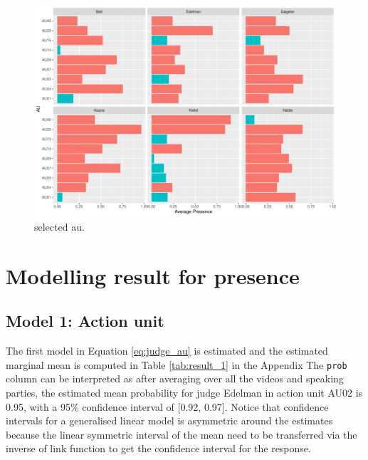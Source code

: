\documentclass{monashthesis}
\begin{document}
\begin{figure}

{\centering \includegraphics[width=1\linewidth]{figures/selected-au-intensity-1} 

}

\caption{selected au.}\label{fig:selected-au-intensity}
\end{figure}

\newpage

\hypertarget{modelling-result-for-presence}{%
\section{Modelling result for presence}\label{modelling-result-for-presence}}

\hypertarget{model-1-action-unit-1}{%
\subsection{Model 1: Action unit}\label{model-1-action-unit-1}}

The first model in Equation \ref{eq:judge_au} is estimated and the estimated marginal mean is computed in Table \ref{tab:result_1} in the Appendix The \texttt{prob} column can be interpreted as after averaging over all the videos and speaking parties, the estimated mean probability for judge Edelman in action unit AU02 is 0.95, with a 95\% confidence interval of {[}0.92, 0.97{]}. Notice that confidence intervals for a generalised linear model is asymmetric around the estimates because the linear symmetric interval of the mean need to be transferred via the inverse of link function to get the confidence interval for the response.
\end{document}
